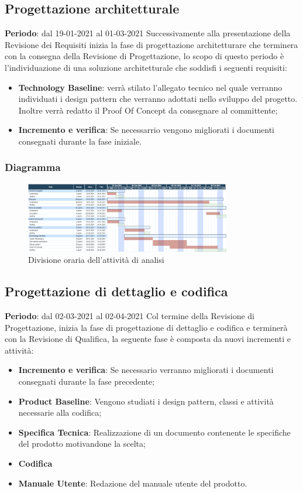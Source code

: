 	\subsection{Progettazione architetturale}
	\textbf{Periodo}: dal 19-01-2021 al 01-03-2021
	Successivamente alla presentazione della Revisione dei Requisiti inizia la fase di progettazione architetturare che terminera con la consegna della Revisione di Progettazione, lo scopo di questo periodo è l'individuazione di una soluzione architetturale che soddisfi i seguenti requisiti:
	\begin{itemize}
		\item \textbf{Technology Baseline}: verrà stilato l'allegato tecnico nel quale verranno individuati i design pattern che verranno adottati nello sviluppo del progetto. Inoltre verrà redatto il Proof Of Concept da consegnare al committente;
		\item \textbf{Incremento e verifica}: Se necessarrio vengono migliorati i documenti consegnati durante la fase iniziale.
	\end{itemize}
	
	\subsubsection{Diagramma}
		\begin{figure}[H]
        		\centering
        		\includegraphics[width=0.8\textwidth]{source/img/Progettazione_architetturale.png}
        		\caption{Divisione oraria dell'attività di analisi}
    		\end{figure}
	
	\subsection{Progettazione di dettaglio e codifica}
	\textbf{Periodo}: dal 02-03-2021 al 02-04-2021
	Col termine della Revisione di Progettazione, inizia la fase di progettazione di dettaglio e codifica e terminerà con la Revisione di Qualifica, la seguente fase è composta da nuovi incrementi e attività:
	\begin{itemize}
		\item \textbf{Incremento e verifica}: Se necessario verranno migliorati i documenti consegnati durante la fase precedente;
		\item \textbf{Product Baseline}: Vengono studiati i design pattern, classi e attività necessarie alla codifica;
		\item \textbf{Specifica Tecnica}: Realizzazione di un documento contenente le specifiche del prodotto motivandone la scelta;
		\item \textbf{Codifica}
		\item \textbf{Manuale Utente}: Redazione del manuale utente del prodotto.
	\end{itemize}
	
